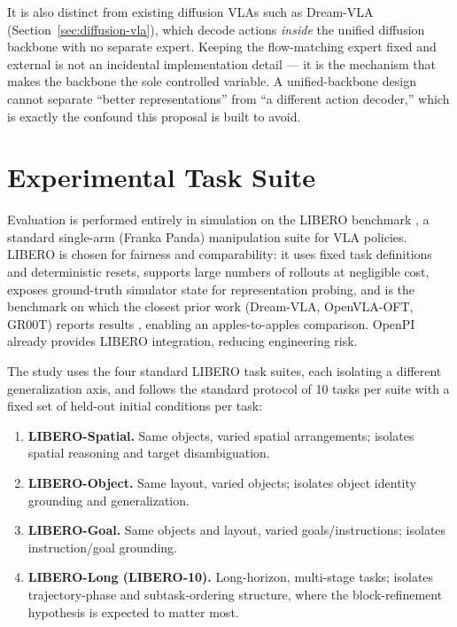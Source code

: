 \documentclass[11pt]{article}
\begin{document}
It is also distinct from existing diffusion VLAs such as Dream-VLA (Section~\ref{sec:diffusion-vla}), which decode actions \emph{inside} the unified diffusion backbone with no separate expert. Keeping the flow-matching expert fixed and external is not an incidental implementation detail --- it is the mechanism that makes the backbone the sole controlled variable. A unified-backbone design cannot separate ``better representations'' from ``a different action decoder,'' which is exactly the confound this proposal is built to avoid.

\section{Experimental Task Suite}

Evaluation is performed entirely in simulation on the LIBERO benchmark \cite{libero}, a standard single-arm (Franka Panda) manipulation suite for VLA policies. LIBERO is chosen for fairness and comparability: it uses fixed task definitions and deterministic resets, supports large numbers of rollouts at negligible cost, exposes ground-truth simulator state for representation probing, and is the benchmark on which the closest prior work (Dream-VLA, OpenVLA-OFT, GR00T) reports results \cite{dreamvla}, enabling an apples-to-apples comparison. OpenPI already provides LIBERO integration, reducing engineering risk.

The study uses the four standard LIBERO task suites, each isolating a different generalization axis, and follows the standard protocol of 10 tasks per suite with a fixed set of held-out initial conditions per task:

\begin{enumerate}
    \item \textbf{LIBERO-Spatial.} Same objects, varied spatial arrangements; isolates spatial reasoning and target disambiguation.
    \item \textbf{LIBERO-Object.} Same layout, varied objects; isolates object identity grounding and generalization.
    \item \textbf{LIBERO-Goal.} Same objects and layout, varied goals/instructions; isolates instruction/goal grounding.
    \item \textbf{LIBERO-Long (LIBERO-10).} Long-horizon, multi-stage tasks; isolates trajectory-phase and subtask-ordering structure, where the block-refinement hypothesis is expected to matter most.
\end{enumerate}
\end{document}
